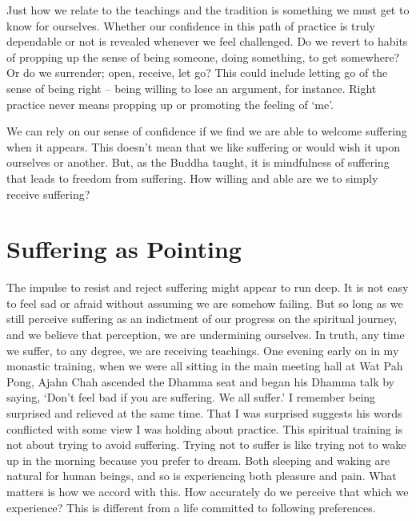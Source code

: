 Just how we relate to the teachings and the tradition is something we
must get to know for ourselves. Whether our confidence in this path of
practice is truly dependable or not is revealed whenever we feel
challenged. Do we revert to habits of propping up the sense of being
someone, doing something, to get somewhere? Or do we surrender; open,
receive, let go? This could include letting go of the sense of being
right – being willing to lose an argument, for instance. Right practice
never means propping up or promoting the feeling of ‘me’.

We can rely on our sense of confidence if we find we are able to welcome
suffering when it appears. This doesn’t mean that we like suffering or
would wish it upon ourselves or another. But, as the Buddha taught, it
is mindfulness of suffering that leads to freedom from suffering. How
willing and able are we to simply receive suffering?

\section{Suffering as Pointing}

The impulse to resist and reject suffering might appear to run deep. It
is not easy to feel sad or afraid without assuming we are somehow
failing. But so long as we still perceive suffering as an indictment of
our progress on the spiritual journey, and we believe that perception,
we are undermining ourselves. In truth, any time we suffer, to any
degree, we are receiving teachings. One evening early on in my monastic
training, when we were all sitting in the main meeting hall at Wat Pah
Pong, Ajahn Chah ascended the Dhamma seat and began his Dhamma talk by
saying, ‘Don’t feel bad if you are suffering. We all suffer.’ I remember
being surprised and relieved at the same time. That I was surprised
suggests his words conflicted with some view I was holding about
practice. This spiritual training is not about trying to avoid
suffering. Trying not to suffer is like trying not to wake up in the
morning because you prefer to dream. Both sleeping and waking are
natural for human beings, and so is experiencing both pleasure and pain.
What matters is how we accord with this. How accurately do we perceive
that which we experience? This is different from a life committed to
following preferences.

